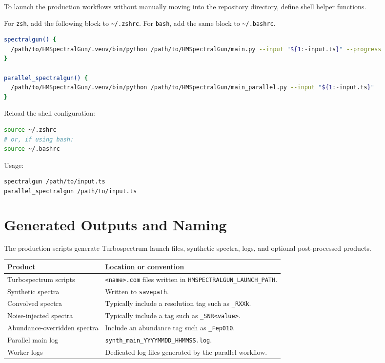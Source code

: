 \documentclass[11pt,a4paper]{article}
\newcommand{\code}[1]{\texttt{#1}}
\begin{document}
To launch the production workflows without manually moving into the repository directory, define shell helper functions.

For \code{zsh}, add the following block to \code{\textasciitilde/.zshrc}. For \code{bash}, add the same block to \code{\textasciitilde/.bashrc}.

\begin{lstlisting}[language=bash]
spectralgun() {
  /path/to/HMSpectralGun/.venv/bin/python /path/to/HMSpectralGun/main.py --input "${1:-input.ts}" --progress
}

parallel_spectralgun() {
  /path/to/HMSpectralGun/.venv/bin/python /path/to/HMSpectralGun/main_parallel.py --input "${1:-input.ts}"
}
\end{lstlisting}

Reload the shell configuration:

\begin{lstlisting}[language=bash]
source ~/.zshrc
# or, if using bash:
source ~/.bashrc
\end{lstlisting}

Usage:

\begin{lstlisting}[language=bash]
spectralgun /path/to/input.ts
parallel_spectralgun /path/to/input.ts
\end{lstlisting}

\section{Generated Outputs and Naming}

The production scripts generate Turbospectrum launch files, synthetic spectra, logs, and optional post-processed products.

\begin{longtable}{p{}p{}}
\toprule
\textbf{Product} & \textbf{Location or convention} \\
\midrule
Turbospectrum scripts & \code{<name>.com} files written in \code{HMSPECTRALGUN\_LAUNCH\_PATH}. \\
Synthetic spectra & Written to \code{savepath}. \\
Convolved spectra & Typically include a resolution tag such as \code{\_RXXk}. \\
Noise-injected spectra & Typically include a tag such as \code{\_SNR<value>}. \\
Abundance-overridden spectra & Include an abundance tag such as \code{\_Fep010}. \\
Parallel main log & \code{synth\_main\_YYYYMMDD\_HHMMSS.log}. \\
Worker logs & Dedicated log files generated by the parallel workflow. \\
\bottomrule
\end{longtable}
\end{document}
